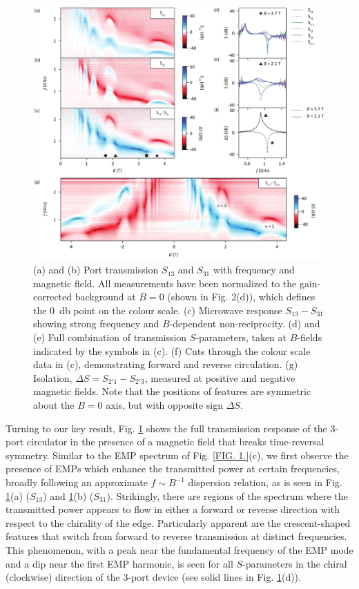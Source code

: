 \begin{figure}
\includegraphics[width=\textwidth]{fig3_QH}
\caption[Non-reciprocal response of the quantum Hall circulator]{\label{FIG. 3.}
(a) and (b) Port transmission $S_{13}$ and $S_{31}$ with frequency and magnetic field. All measurements have been normalized to the gain-corrected background at $B = 0$ (shown in Fig. 2(d)), which defines the \SI{0}{\decibel} point on the colour scale. 
(c) Microwave response $S_{13}-S_{31}$ showing strong frequency and $B$-dependent non-reciprocity. 
(d) and (e) Full combination of transmission $S$-parameters, taken at $B$-fields indicated by the symbols in (c). 
(f) Cuts through the colour scale data in (c), demonstrating forward and reverse circulation. 
(g) Isolation, $\Delta S = S_{2'1}-S_{2'3}$, measured at positive and negative magnetic fields. Note that the positions of features are symmetric about the $B = 0$ axis, but with opposite sign $\Delta S$.}
\end{figure}

Turning to our key result, Fig. \ref{FIG. 3.} shows the full transmission response of the 3-port circulator in the presence of a magnetic field that breaks time-reversal symmetry. Similar to the EMP spectrum of Fig. \ref{FIG. 1.}(c), we first observe the presence of EMPs which enhance the transmitted power at certain frequencies, broadly following an approximate $f \sim B^{-1}$ dispersion relation, as is seen in Fig. \ref{FIG. 3.}(a) ($S_{13}$) and \ref{FIG. 3.}(b) ($S_{31}$). Strikingly, there are regions of the spectrum where the transmitted power appears to flow in either a forward or reverse direction with respect to the chirality of the edge. Particularly apparent are the crescent-shaped features that switch from forward to reverse transmission at distinct frequencies. This phenomenon, with a peak near the fundamental frequency of the EMP mode and a dip near the first EMP harmonic, is seen for all $S$-parameters in the chiral (clockwise) direction of the 3-port device (see solid lines in Fig. \ref{FIG. 3.}(d)). 

